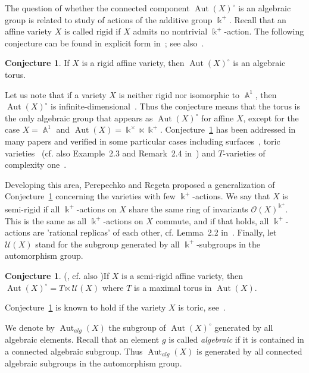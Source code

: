 \documentclass[a4paper,reqno,12pt]{amsart}
\theoremstyle{theorem}
\theoremstyle{definition}
\newtheorem{conjecture}[theorem]{Conjecture}
\theoremstyle{theorem}
\theoremstyle{remark}
\DeclareMathOperator{\Aut}{Aut}
\DeclareMathOperator{\A}{\mathbb A}
\newcommand{\UU}{\mathcal U}
\newcommand{\kk}{\Bbbk}
\newcommand{\0}{\circ}
\begin{document}
The question of whether the connected component $\Aut(X)^\circ$ is an algebraic group is related to study of actions of the additive group $\kk^+$. Recall that an affine variety $X$ is called rigid if $X$ admits no nontrivial $\kk^+$-action. The following conjecture can be found in explicit form in~\cite{PZ}; see also~\cite[Question~9.1.5]{FK}.

\begin{conjecture}\label{RigidConj}
    If $X$ is a rigid affine variety, then $\Aut(X)^\circ$ is an algebraic torus.
\end{conjecture}
Let us note that if a variety $X$ is neither rigid nor isomorphic to $\A^1$, then $\Aut(X)^\circ$ is infinite-dimensional~\cite[Proposition 7.5]{K}. Thus the conjecture means that the torus is the only algebraic group that appears as $\Aut(X)^\circ$ for affine $X$, except for the case $X=\A^1$ and $\Aut(X)=\kk^\times\ltimes\kk^+$. Conjecture~\ref{RigidConj} has been addressed in many papers and verified in some particular cases including surfaces~\cite{PZ, BeP}, toric varieties~\cite{BoldG} (cf. also Example~2.3 and Remark~2.4 in~\cite{AG}) and $T$-varieties of complexity one~\cite{BorG}.

Developing this area, Perepechko and Regeta proposed a generalization of Conjecture~\ref{RigidConj} concerning the varieties with few $\kk^+$-actions. We say that $X$ is semi-rigid if all $\kk^+$-actions on $X$ share the same ring of invariants $\mathcal O(X)^{\kk^+}$. This is the same as all $\kk^+$-actions on $X$ commute, and if that holds, all $\kk^+$-actions are 'rational replicas' of each other, cf. Lemma~2.2 in~\cite{PR23}. Finally, let $\UU(X)$ stand for the subgroup generated by all $\kk^+$-subgroups in the automorphism group.%

\begin{conjecture}(\cite{PR23}, cf. also \cite{PR24})\label{Semi-rigidConj} If $X$ is a semi-rigid affine variety, then $\Aut(X)^\circ=T\ltimes \UU(X)$ where $T$ is a maximal torus in $\Aut(X)$.
    
\end{conjecture}

Conjecture~\ref{Semi-rigidConj} is known to hold if the variety $X$ is toric, see~\cite{BoldG}. 

We denote by $\Aut_{alg}(X)$ the subgroup of $ \Aut(X)^\circ$ generated by all algebraic elements. Recall that an element $g$ is called \emph{algebraic} if it is contained in a connected algebraic subgroup. Thus $\Aut_{alg}(X)$ is generated by all connected algebraic subgroups in the automorphism group. 
\end{document}
